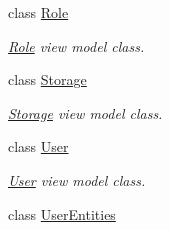 \begin{DoxyCompactItemize}
class \hyperlink{class_p_c_builder_m_v_c_1_1_models_1_1_role}{Role}
\begin{DoxyCompactList}\small\item\em \hyperlink{class_p_c_builder_m_v_c_1_1_models_1_1_role}{Role} view model class. \end{DoxyCompactList}\item 
class \hyperlink{class_p_c_builder_m_v_c_1_1_models_1_1_storage}{Storage}
\begin{DoxyCompactList}\small\item\em \hyperlink{class_p_c_builder_m_v_c_1_1_models_1_1_storage}{Storage} view model class. \end{DoxyCompactList}\item 
class \hyperlink{class_p_c_builder_m_v_c_1_1_models_1_1_user}{User}
\begin{DoxyCompactList}\small\item\em \hyperlink{class_p_c_builder_m_v_c_1_1_models_1_1_user}{User} view model class. \end{DoxyCompactList}\item 
class \hyperlink{class_p_c_builder_m_v_c_1_1_models_1_1_user_entities}{User\+Entities}
\end{DoxyCompactItemize}
